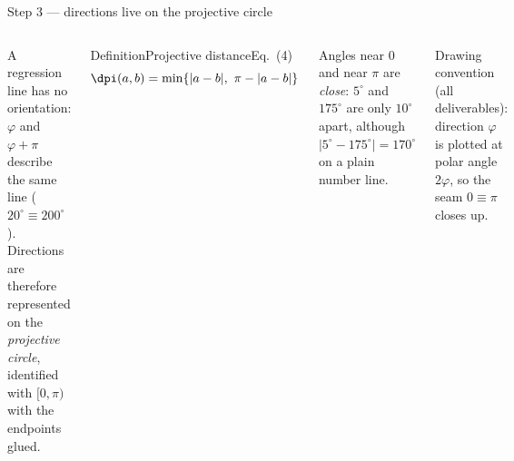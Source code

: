 \documentclass[aspectratio=169,9pt]{beamer}
\newcommand{\cR}{2.0}
\newcommand{\projcircle}[1][30]{%
  \draw[mute,line width=0.9pt] (0,0) circle (\cR);
  \foreach \a in {0,#1,...,150}{%
    \draw[mute] ({(\cR-0.05)*cos(2*\a)},{(\cR-0.05)*sin(2*\a)}) -- ({(\cR+0.05)*cos(2*\a)},{(\cR+0.05)*sin(2*\a)});
    \node[font=\sffamily\tiny,mute] at ({(\cR+0.3)*cos(2*\a)},{(\cR+0.3)*sin(2*\a)}) {$\a^\circ$};}}
\begin{document}
\begin{frame}{Step 3 --- directions live on the projective circle}
\begin{columns}[T]
\centering
{}
\small
A regression line has no orientation: $\varphi$ and $\varphi+\pi$ describe the same line ($20^\circ\equiv200^\circ$). Directions are therefore represented on the \emph{projective circle}, identified with $[0,\pi)$ with the endpoints glued.
\begin{rdef}{Definition}{Projective distance}{Eq.~(4)}
\[\dpi(a,b)=\min\{|a-b|,\ \pi-|a-b|\}\]
\end{rdef}
Angles near $0$ and near $\pi$ are \emph{close}: $5^\circ$ and $175^\circ$ are only $10^\circ$ apart, although $|5^\circ-175^\circ|=170^\circ$ on a plain number line.\smallskip

{\sffamily\scriptsize\color{mute}Drawing convention (all deliverables): direction $\varphi$ is plotted at polar angle $2\varphi$, so the seam $0\equiv\pi$ closes up.}
\end{columns}
\end{frame}
\end{document}
